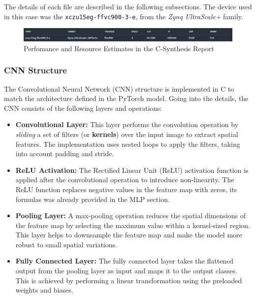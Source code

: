 \documentclass{article}
\begin{document}
The details of each file are described in the following subsections. The device used in this case was the \texttt{xczu15eg-ffvc900-3-e}, from the \textit{Zynq UltraScale+} family.

\begin{figure}[H]
    \centering
    \includegraphics[width=1\textwidth]{./assets/ConvNet/device-used.png}
    \caption{Perfomance and Resource Estimates in the C-Synthesis Report}
    \label{fig:convent-device}
\end{figure}


\subsubsection{CNN Structure}
The Convolutional Neural Network (CNN) structure is implemented in C to match the architecture defined in the PyTorch model. Going into the details, the CNN consists of the following layers and operations:

\begin{itemize}
    \item \textbf{Convolutional Layer:} This layer performs the convolution operation by \textit{sliding} a set of filters (or \textbf{kernels}) over the input image to extract spatial features. The implementation uses nested loops to apply the filters, taking into account padding and stride.
    \item \textbf{ReLU Activation:} The Rectified Linear Unit (ReLU) activation function is applied after the convolutional operation to introduce non-linearity. The ReLU function replaces negative values in the feature map with zeros, its formulas was already provided in the MLP section.
    \item \textbf{Pooling Layer:} A max-pooling operation reduces the spatial dimensions of the feature map by selecting the maximum value within a kernel-sized region. This layer helps to downsample the feature map and make the model more robust to small spatial variations.
    \item \textbf{Fully Connected Layer:} The fully connected layer takes the flattened output from the pooling layer as input and maps it to the output classes. This is achieved by performing a linear transformation using the preloaded weights and biases.
\end{itemize}
\end{document}
